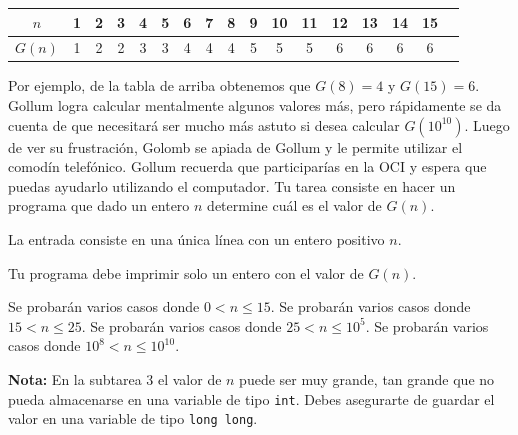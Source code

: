 \documentclass{oci}
\begin{document}
\begin{problemDescription}
\begin{center}
  \begin{tabular}{c|cccccccccccccccc}
	$n$ & 1 & 2 & 3 & 4 & 5 & 6 & 7 & 8 & 9 & 10 & 11 & 12 & 13 & 14 & 15 \\
  \hline
	$G(n)$ & 1 & 2 & 2 & 3 & 3 & 4 & 4 & 4 & 5 & 5 & 5 & 6 & 6 & 6 & 6 
  \end{tabular}
\end{center}
Por ejemplo, de la tabla de arriba obtenemos que $G(8)=4$ y $G(15)=6$. 
Gollum logra calcular mentalmente algunos valores más, pero rápidamente se da cuenta de que necesitará 
ser mucho más astuto si desea calcular $G(10^{10})$.
Luego de ver su frustración, Golomb se apiada de Gollum y le permite utilizar el comodín telefónico.
Gollum recuerda que participarías en la OCI y espera que puedas ayudarlo utilizando el computador.
Tu tarea consiste en hacer un programa que dado un entero $n$ determine cuál es el valor de $G(n)$.
\end{problemDescription}

\begin{inputDescription}
  La entrada consiste en una única línea con un entero positivo $n$.
\end{inputDescription}

\begin{outputDescription}
  Tu programa debe imprimir solo un entero con el valor de $G(n)$.
\end{outputDescription}

\begin{scoreDescription}
   Se probarán varios casos donde $0 < n \leq 15$.
   Se probarán varios casos donde $15 < n \leq 25$.
   Se probarán varios casos donde $25 < n \leq 10^5$.
   Se probarán varios casos donde $10^{8} < n \leq 10^{10}$.
\end{scoreDescription}
\textbf{Nota:} En la subtarea 3 el valor de $n$ puede ser muy grande, tan grande que no pueda almacenarse 
en una variable de tipo \texttt{int}. Debes asegurarte de guardar el valor en una variable de tipo \texttt{long long}.

\begin{sampleDescription}
\end{sampleDescription}
\end{document}
